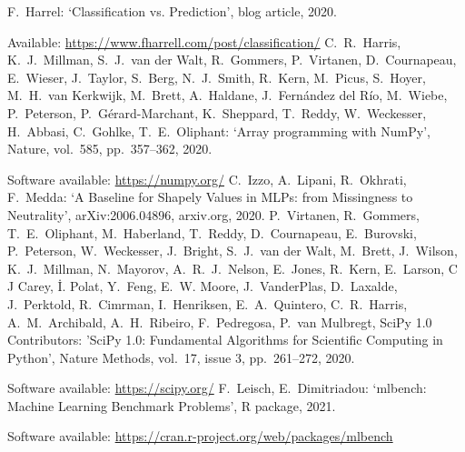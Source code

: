 \begin{thebibliography}{99}
%
F.\ Harrel: `Classification vs. Prediction', blog article, 2020.\par
%
Available: \url{https://www.fharrell.com/post/classification/}
%
C.\ R.\ Harris, K.\ J.\ Millman, S.\ J.\ van der Walt, R.\ Gommers, P.\ Virtanen, D.\ Cournapeau, E.\ Wieser, J.\ Taylor, S.\ Berg, N.\ J.\ Smith, R.\ Kern, M.\ Picus, S.\ Hoyer, M.\ H.\ van Kerkwijk, M.\ Brett, A.\ Haldane, J.\ Fern{\'a}ndez del R{\'i}o, M.\ Wiebe, P.\ Peterson, P.\ G{\'e}rard-Marchant, K.\ Sheppard, T.\ Reddy, W.\ Weckesser, H.\ Abbasi, C.\ Gohlke, T.\ E.\ Oliphant: `Array programming with NumPy', Nature, vol.\ 585, pp.\ 357--362, 2020.\par
%
Software available: \url{https://numpy.org/}
%
C.\ Izzo, A.\ Lipani, R.\ Okhrati, F.\ Medda: `A Baseline for Shapely Values in MLPs: from Missingness to Neutrality', arXiv:2006.04896, arxiv.org, 2020.
%
P.\ Virtanen, R.\ Gommers, T.\ E.\ Oliphant, M.\ Haberland, T.\ Reddy, D.\ Cournapeau, E.\ Burovski, P.\ Peterson, W.\ Weckesser, J.\ Bright, S.\ J.\ van der Walt, M.\ Brett, J.\ Wilson, K.\ J.\ Millman, N.\ Mayorov, A.\ R.\ J.\ Nelson, E.\ Jones, R.\ Kern, E.\ Larson, C J Carey, {\.I}. Polat, Y.\ Feng, E.\ W. Moore, J.\ VanderPlas, D.\ Laxalde, J.\ Perktold, R.\ Cimrman, I.\ Henriksen, E.\ A.\ Quintero, C.\ R.\ Harris, A.\ M.\ Archibald, A.\ H.\ Ribeiro, F.\ Pedregosa, P.\ van Mulbregt, SciPy 1.0 Contributors: 'SciPy 1.0: Fundamental Algorithms for Scientific Computing in Python', Nature Methods, vol.\ 17, issue 3, pp.\ 261--272, 2020.\par
%
Software available: \url{https://scipy.org/}
%
F.\ Leisch, E.\ Dimitriadou: `mlbench: Machine Learning Benchmark Problems', R package, 2021.\par
%
Software available: \url{https://cran.r-project.org/web/packages/mlbench}
\end{thebibliography}
\endinput
